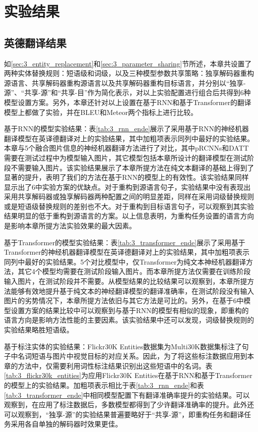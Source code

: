 \section{实验结果}

\subsection{英德翻译结果}

如\ref{sec:3_entity_replacement}和\ref{sec:3_parameter_sharing}节所述，本章共设置了两种实体替换规则：短语级和词级，以及三种模型参数共享策略：独享解码器重构源语言、共享解码器重构源语言以及共享解码器重构目标语言，并分别以“独享-源”、“共享-源”和“共享-目”作为简化表示，对以上实验配置进行组合后共得到6种模型设置方案。另外，本章还针对以上设置在基于RNN和基于Transformer的翻译模型上都做了实验，并在BLEU\cite{42_papineni-etal-2002-bleu}和Meteor\cite{46_denkowski-lavie-2014-meteor}两个指标上进行比较。

{\sffamily 基于RNN的模型实验结果：}表\ref{tab:3_rnn_ende}展示了采用基于RNN的神经机器翻译模型在英译德翻译对上的实验结果，其中加粗项表示同列中最好的实验结果。本章与5个融合图片信息的神经机器翻译方法进行了对比，其中pRCNNs和DATT需要在测试过程中为模型输入图片，其它模型包括本章所设计的翻译模型在测试阶段不需要输入图片。该实验结果展示了本章所提方法在纯文本翻译的基础上得到了显著的提升，表明了我们的方法在基于RNN的模型上的有效性。该实验结果同样显示出了6中实验方案的优缺点。对于重构到源语言句子，实验结果中没有表现出采用共享解码器或独享解码器两种配置之间的明显差距，同样在采用词级替换规则或是短语级替换规则的差别也不大。对于重构到目标语言句子，可以观察到其实验结果明显的低于重构到源语言的方案。以上信息表明，为重构任务设置的语言方向是影响本章所提方法实验效果的最大因素。


{\sffamily 基于Transformer的模型实验结果：}表\ref{tab:3_transformer_ende}展示了采用基于Transformer的神经机器翻译模型在英译德翻译对上的实验结果，其中加粗项表示同列中最好的实验结果。5个对比模型中，仅Transformer为纯文本神经机器翻译方法，其它4个模型均需要在测试阶段输入图片。而本章所提方法仅需要在训练阶段输入图片，在测试阶段并不需要。从模型结果的比较结果可以观察到，本章所提方法能够有效地提升基于纯文本的神经翻译模型的翻译准确率，在测试阶段没有输入图片的劣势情况下，本章所提方法依旧与其它方法是可比的。另外，在基于6中模型设置方案的结果比较中可以观察到与基于RNN的模型有相似的现象，即重构的语言方向是影响方法性能的主要因素。该实验结果中还可以发现，词级替换规则的实验结果略胜短语级。


{\sffamily 基于标注实体的实验结果：}Flickr30K Entities数据集为Multi30K数据集标注了句子中名词短语与图片中视觉目标的对应关系。因此，为了将这些标注数据应用到本章的方法中，仅需要利用词性标注结果识别出这些短语中的名词。表\ref{tab:3_flickr30k_entities}为应用Flickr30K Entities在基于RNN和基于Transformer的模型上的实验结果。加粗项表示相比于表\ref{tab:3_rnn_ende}和表\ref{tab:3_transformer_ende}中相同模型配置下有翻译准确率提升的实验结果。可以观察到，在应用了标注数据后，多数模型都得到了少许翻译准确率的提升。此外还可以观察到，“独享-源”的实验结果普遍要略好于“共享-源”，即重构任务和翻译任务采用各自单独的解码器时效果更佳。

